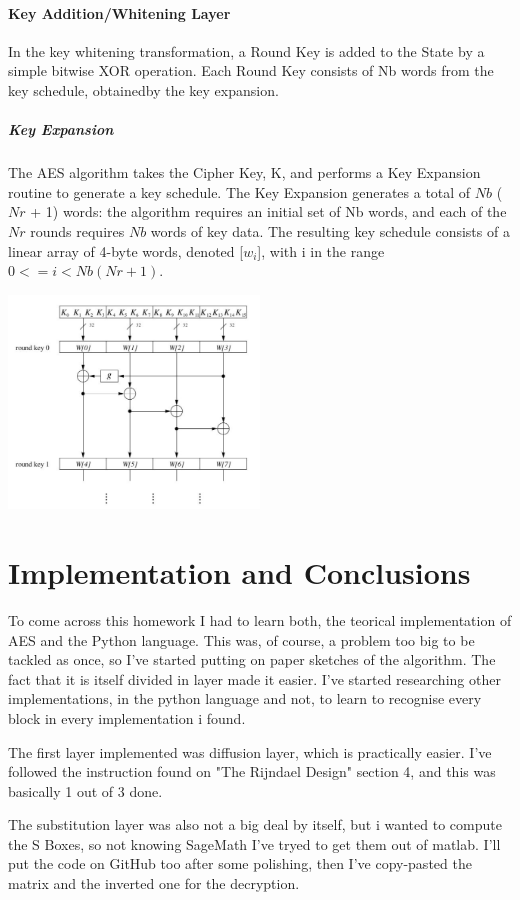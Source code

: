 \documentclass[11 pt]{article}
\begin{document}
\paragraph{Key Addition/Whitening Layer}
In the key whitening transformation, a Round Key is added to the State by a simple bitwise XOR operation.  Each Round Key consists of Nb words from the key schedule, obtainedby the key expansion.
\subparagraph{Key Expansion}
The AES algorithm takes the Cipher Key, K, and performs a Key Expansion routine to generate a key schedule. The Key Expansion generates a total of $Nb$ ($Nr$ + 1) words: the algorithm requires an  initial  set  of  Nb  words,  and  each  of  the  $Nr$  rounds  requires  $Nb$  words  of  key  data.    The  resulting key schedule consists of a linear array of 4-byte words, denoted [$w_i$], with i in the range $0 <= i < Nb(Nr + 1)$.
\begin{center}
\includegraphics[width=0.5\textwidth]{KeyExp_Slides.png}
\end{center}


\section{Implementation and Conclusions}
To come across this homework I had to learn both, the teorical implementation of AES and the Python language.
This was, of course, a problem too big to be tackled as once, so I've started putting on paper sketches of the algorithm. The fact that it is itself divided in layer made it easier.
I've started researching other implementations, in the python language and not, to learn to recognise every block in every implementation i found.

The first layer implemented was diffusion layer, which is practically easier.
I've followed the instruction found on "The Rijndael Design" section 4, and this was basically 1 out of 3 done.

The substitution layer was also not a big deal by itself, but i wanted to compute the S Boxes, so not knowing SageMath I've tryed to get them out of matlab. I'll put the code on GitHub too after some polishing, then I've copy-pasted the matrix and the inverted one for the decryption.
\end{document}
